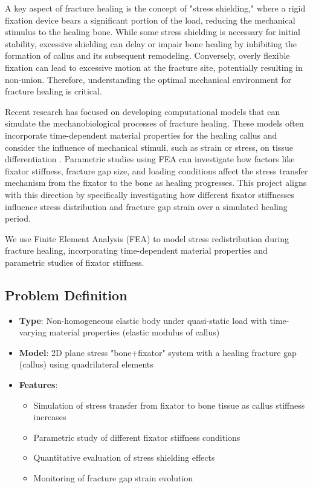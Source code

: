 \documentclass{article}
\begin{document}
A key aspect of fracture healing is the concept of "stress shielding," where a rigid fixation device bears a significant portion of the load, reducing the mechanical stimulus to the healing bone. While some stress shielding is necessary for initial stability, excessive shielding can delay or impair bone healing by inhibiting the formation of callus and its subsequent remodeling. Conversely, overly flexible fixation can lead to excessive motion at the fracture site, potentially resulting in non-union. Therefore, understanding the optimal mechanical environment for fracture healing is critical.

Recent research has focused on developing computational models that can simulate the mechanobiological processes of fracture healing. These models often incorporate time-dependent material properties for the healing callus and consider the influence of mechanical stimuli, such as strain or stress, on tissue differentiation \citep{morgan2024novel}. Parametric studies using FEA can investigate how factors like fixator stiffness, fracture gap size, and loading conditions affect the stress transfer mechanism from the fixator to the bone as healing progresses. This project aligns with this direction by specifically investigating how different fixator stiffnesses influence stress distribution and fracture gap strain over a simulated healing period.

We use Finite Element Analysis (FEA) to model stress redistribution during fracture healing, incorporating time-dependent material properties and parametric studies of fixator stiffness.

\subsection{Problem Definition}

\begin{itemize}
  \item \textbf{Type}: Non-homogeneous elastic body under quasi-static load with time-varying material properties (elastic modulus of callus)
  \item \textbf{Model}: 2D plane stress "bone+fixator" system with a healing fracture gap (callus) using quadrilateral elements
  \item \textbf{Features}: 
  \begin{itemize}
    \item Simulation of stress transfer from fixator to bone tissue as callus stiffness increases
    \item Parametric study of different fixator stiffness conditions
    \item Quantitative evaluation of stress shielding effects
    \item Monitoring of fracture gap strain evolution
  \end{itemize}
\end{itemize}
\end{document}
